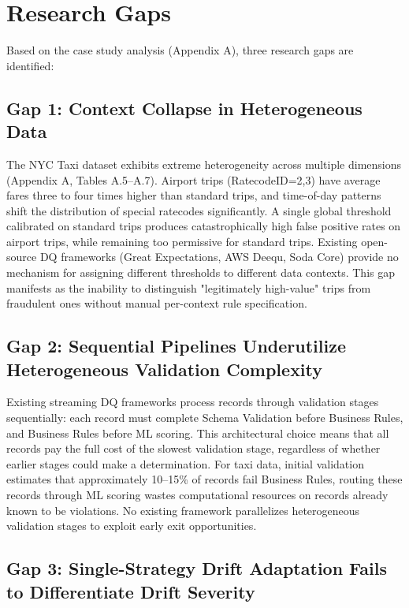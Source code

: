 \section{Research Gaps}

Based on the case study analysis (Appendix A), three research gaps are identified:

\subsection{Gap 1: Context Collapse in Heterogeneous Data}

The NYC Taxi dataset exhibits extreme heterogeneity across multiple dimensions (Appendix A, Tables A.5--A.7). Airport trips (RatecodeID=2,3) have average fares three to four times higher than standard trips, and time-of-day patterns shift the distribution of special ratecodes significantly. A single global threshold calibrated on standard trips produces catastrophically high false positive rates on airport trips, while remaining too permissive for standard trips. Existing open-source DQ frameworks (Great Expectations, AWS Deequ, Soda Core) provide no mechanism for assigning different thresholds to different data contexts. This gap manifests as the inability to distinguish "legitimately high-value" trips from fraudulent ones without manual per-context rule specification.

\subsection{Gap 2: Sequential Pipelines Underutilize Heterogeneous Validation Complexity}

Existing streaming DQ frameworks process records through validation stages sequentially: each record must complete Schema Validation before Business Rules, and Business Rules before ML scoring. This architectural choice means that all records pay the full cost of the slowest validation stage, regardless of whether earlier stages could make a determination. For taxi data, initial validation estimates that approximately 10--15\% of records fail Business Rules, routing these records through ML scoring wastes computational resources on records already known to be violations. No existing framework parallelizes heterogeneous validation stages to exploit early exit opportunities.

\subsection{Gap 3: Single-Strategy Drift Adaptation Fails to Differentiate Drift Severity}

